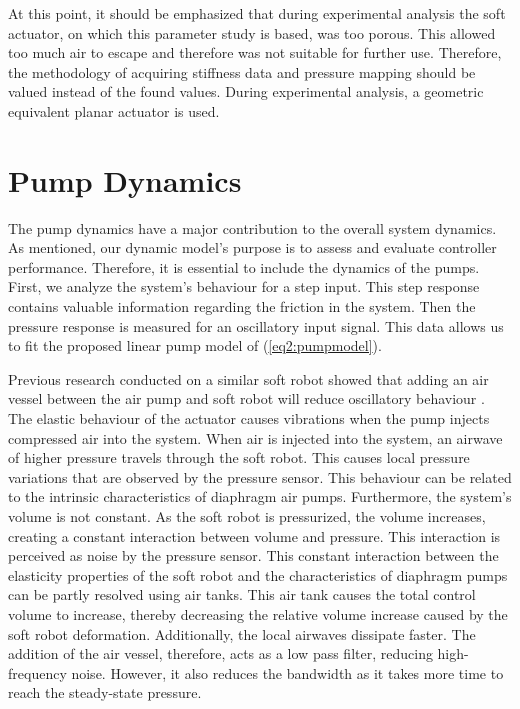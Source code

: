 At this point, it should be emphasized that during experimental analysis the soft actuator, on which this parameter study is based, was too porous. This allowed too much air to escape and therefore was not suitable for further use. Therefore, the methodology of acquiring stiffness data and pressure mapping should be valued instead of the found values. During experimental analysis, a geometric equivalent planar actuator is used. 



\section{Pump Dynamics}



The pump dynamics have a major contribution to the overall system dynamics. As mentioned, our dynamic model's purpose is to assess and evaluate controller performance. Therefore, it is essential to include the dynamics of the pumps. First, we analyze the system's behaviour for a step input. This step response contains valuable information regarding the friction in the system. Then the pressure response is measured for an oscillatory input signal. This data allows us to fit the proposed linear pump model of (\ref{eq2:pumpmodel}).


Previous research conducted on a similar soft robot showed that adding an air vessel between the air pump and soft robot will reduce oscillatory behaviour \cite{proper}. The elastic behaviour of the actuator causes vibrations when the pump injects compressed air into the system. When air is injected into the system, an airwave of higher pressure travels through the soft robot. This causes local pressure variations that are observed by the pressure sensor. This behaviour can be related to the intrinsic characteristics of diaphragm air pumps. Furthermore, the system's volume is not constant. As the soft robot is pressurized, the volume increases, creating a constant interaction between volume and pressure. This interaction is perceived as noise by the pressure sensor. This constant interaction between the elasticity properties of the soft robot and the characteristics of diaphragm pumps can be partly resolved using air tanks. This air tank causes the total control volume to increase, thereby decreasing the relative volume increase caused by the soft robot deformation. Additionally, the local airwaves dissipate faster. The addition of the air vessel, therefore, acts as a low pass filter, reducing high-frequency noise. However, it also reduces the bandwidth as it takes more time to reach the steady-state pressure.

